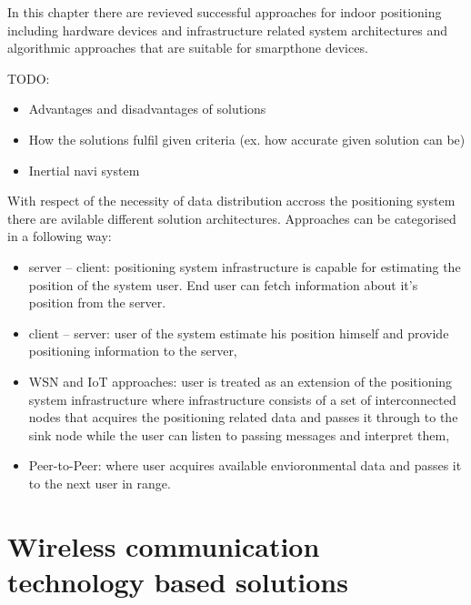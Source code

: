 \documentclass[../main.tex]{subfiles}
\begin{document}
In this chapter there are revieved successful approaches for indoor positioning including hardware devices and infrastructure related system architectures and algorithmic approaches that are suitable for smarpthone devices.




TODO:
\begin{itemize}
	\item Advantages and disadvantages of solutions
	\item How the solutions fulfil given criteria (ex. how accurate given solution can be)
	\item Inertial navi system
\end{itemize}




With respect of the necessity of data distribution accross the positioning system there are avilable different solution architectures. Approaches can be categorised in a following way:
\begin{itemize}
	\item server -- client: positioning system infrastructure is capable for estimating the position of the system user. End user can fetch information about it's position from the server.
	\item client -- server: user of the system estimate his position himself and provide positioning information to the server,
	\item WSN and IoT approaches: user is treated as an extension of the positioning system infrastructure where infrastructure consists of a set of interconnected nodes that acquires the positioning related data and passes it through to the sink node while the user can listen to passing messages and interpret them,
	\item Peer-to-Peer: where user acquires available envioronmental data and passes it to the next user in range.
\end{itemize}


\section{Wireless communication technology based solutions}
\end{document}
